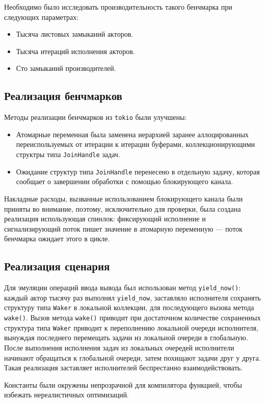 Необходимо было исследовать производительность такого бенчмарка при следующих параметрах:

\begin{itemize}
    \item Тысяча листовых замыканий акторов.
    \item Тысяча итераций исполнения акторов.
    \item Сто замыканий производителей.
\end{itemize}

\subsection{Реализация бенчмарков}

Методы реализации бенчмарков из \verb|tokio| были улучшены:

\begin{itemize}
    \item Атомарные переменная была заменена иерархией заранее аллоцированных переиспользуемых от итерации к итерации буферами, коллекционирующими структры типа \verb|JoinHandle| задач.
    \item Ожидание структур типа \verb|JoinHandle| перенесено в отдельную задачу, которая сообщает о завершении обработки с помощью блокирующего канала.
\end{itemize}

Накладные расходы, вызванные использованием блокирующего канала были приняты во внимание, поэтому, исключительно для проверки, была создана реализация использующая спинлок: фиксирующий исполнение и сигнализирующий поток пишет значение в атомарную переменную --- поток бенчмарка ожидает этого в цикле.

\subsection{Реализация сценария}

Для эмуляции операций ввода вывода был использован метод \verb|yield_now()|: каждый актор тысячу раз выполнял \verb|yield_now|, заставляло исполнителя сохранять структуру типа \verb|Waker| в локальной коллекции, для последующего вызова метода \verb|wake()|. Вызов метода \verb|wake()| приводит при достаточном количестве сохраненных структура типа \verb|Waker| приводит к переполнению локальной очереди исполнителя, вынуждая последнего перемещать задачи из локальной очереди в глобальную. После выполнения исполнения задач из локальных очередей исполнители начинают обращаться к глобальной очереди, затем похищают задачи друг у друга. Такая реализация заставляет исполнителей беспрестанно взаимодействовать.

Константы были окружены непрозрачной для компилятора функцией, чтобы избежать нереалистичных оптимизаций.
